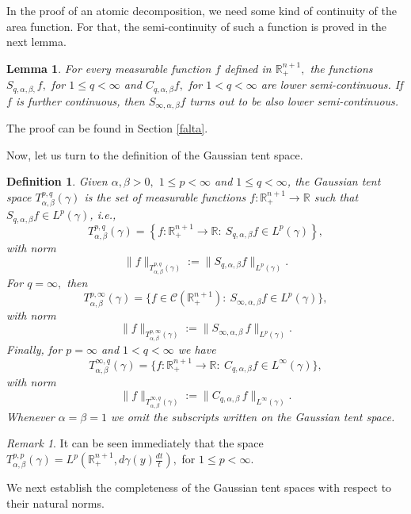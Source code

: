 \documentclass[leqno,11pt]{amsart}
\theoremstyle{plain}
\newtheorem{lemma}{Lemma}
\newtheorem{defi}{Definition}
\theoremstyle{remark}
\newtheorem{remark}{Remark}
\begin{document}
{In the proof of an atomic decomposition, we need some kind of continuity of the area function. For that, the semi-continuity of such a function is proved in the next lemma.


\begin{lemma}\label{continuity}
For every measurable function $f$ defined in $\mathbb{R}^{n+1}_+,$ the functions $S_{q,\alpha, \beta, } f,$ for $1\le q<\infty$ and $C_{q, \alpha, \beta}f,$ for $1<q<\infty$ are lower semi-continuous. If $f$ is further continuous, then $S_{\infty, \alpha, \beta}f$ turns out to be also lower semi-continuous.
\end{lemma}
\noindent  The proof can be found in Section \ref{falta}. 


Now, let us turn to the definition of the Gaussian tent space.

\begin{defi}\label{edison}  Given $ \alpha, \beta >0,$ $1 \leq p <\infty$ and $1 \leq q< \infty$, the Gaussian tent space $T^{p,q}_{\alpha, \beta} (\gamma)$ is the set of measurable functions $f:{\mathbb R}^{n+1}_+\to \mathbb{R}$ such that $S_{q,\alpha, \beta}f\in L^p(\gamma)$, i.e.,
$$T^{p,q}_{\alpha, \beta} (\gamma)=\left\{f:{\mathbb R}^{n+1}_+\to \mathbb{R}:\  S_{q,\alpha, \beta}f\in L^p(\gamma)\right\},$$
 with norm
\[\|f\|_{T_{\alpha,\beta}^{p,q}(\gamma)}:=\|S_{q,\alpha, \beta}f\|_{L^p(\gamma)}.\]
For $q=\infty,$ then \[T^{p,\infty}_{\alpha,\beta}(\gamma)=\{f\in \mathscr{C}(\mathbb{R}_+^{n+1}):\  S_{\infty, \alpha,\beta}f\in L^p(\gamma) 
\},\]
with norm
\[\| f\|_{T^{p, \infty}_{\alpha, \beta}(\gamma)}:=\|S_{\infty, \alpha,\beta}\, f\|_{L^p(\gamma)}.\]
Finally,
for $p=\infty$ and $1< q<\infty$ we have
{
\[ T_{\alpha, \beta}^{\infty, q}(\gamma)=\{f:\mathbb{R}^{n+1}_+\to \mathbb{R}:\  C_{q, \alpha, \beta}f\in L^\infty(\gamma)\},\]}
{with norm $$\|f\|_{T^{\infty, q}_{\alpha, \beta}(\gamma)}:=\|C_{q,\alpha,\beta}\, f\|_{L^\infty(\gamma)}.$$}
Whenever $\alpha=\beta=1$ we omit the subscripts written on the Gaussian tent space.
\end{defi}


  
\begin{remark}It can be seen immediately that the space $T^{p,p}_{\alpha, \beta}(\gamma)=L^p(\mathbb{R}^{n+1}_+, d\gamma(y)\frac{dt}{t}),$ for $1\le p<\infty.$ 
\end{remark}
 
 

We next establish the completeness of the Gaussian tent spaces with respect to their natural norms.


}
\end{document}
